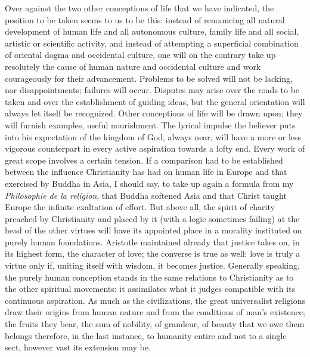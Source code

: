 \documentclass[12pt,a4paper]{article}
\newcommand{\opage}[1]{\marginnote{\footnotesize\textit{[#1]}}}
\begin{document}
Over against the two other conceptions of life that we have indicated, the
position to be taken seems to us to be this: instead of renouncing all natural
development of human life and all autonomous culture, family life and all social,
artistic or scientific activity, and instead of attempting a superficial
combination of
\opage{244}oriental dogma and occidental culture, one will on the contrary take up
resolutely the cause of human nature and occidental culture and work
courageously for their advancement. Problems to be solved will not be lacking,
nor disappointments; failures will occur. Disputes may arise over the roads to
be taken and over the establishment of guiding ideas, but the general
orientation will always let itself be recognized. Other conceptions of life will
be drawn upon; they will furnish examples, useful nourishment. The lyrical
impulse the believer puts into his expectation of the kingdom of God, always
near, will have a more or less vigorous counterpart in every active aspiration
towards a lofty end. Every work of great scope involves a certain tension. If a
comparison had to be established between the influence Christianity has had on
human life in Europe and that exercised by Buddha in Asia, I should say, to take
up again a formula from my \emph{Philosophie de la religion}, that Buddha
softened Asia and that Christ taught Europe the infinite exaltation of effort.
But above all, the spirit of charity preached by Christianity and placed by it
(with a logic sometimes failing) at the head of the other virtues will have its
appointed place in a morality instituted on purely human foundations. Aristotle
maintained already that justice takes on, in its highest form, the character of
love; the converse is true as well: love is truly a virtue only if, uniting
itself with wisdom, it becomes justice. Generally speaking, the purely human
conception stands in the same relations to Christianity as to the other spiritual
movements: it assimilates what it judges compatible with its continuous
aspiration. As much as the civilizations, the great universalist religions draw
their origins from human nature and from the conditions of man's existence; the
fruits they bear, the sum of nobility, of grandeur, of beauty that we owe them
belongs therefore, in the last instance, to humanity entire and not to a single
sect, however vast its extension may be.
\end{document}
